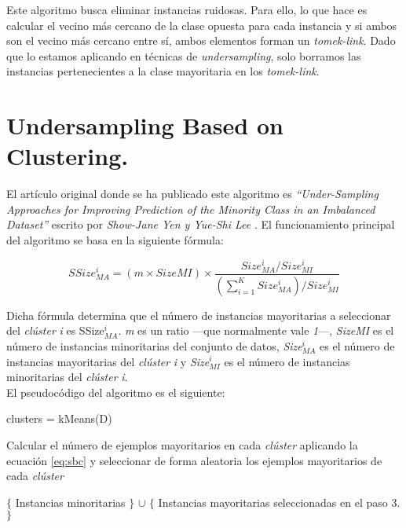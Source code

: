 Este algoritmo busca eliminar instancias ruidosas. Para ello, lo que hace es calcular el vecino más cercano de la clase opuesta para cada instancia y si ambos son el vecino más cercano entre sí, ambos elementos forman un \textit{tomek-link}. Dado que lo estamos aplicando en técnicas de \textit{undersampling}, solo borramos las instancias pertenecientes a la clase mayoritaria en los \textit{tomek-link}.

\section{Undersampling Based on Clustering.} \label{sec:alg_sbc}
El artículo original donde se ha publicado este algoritmo es \textit{``Under-Sampling Approaches for Improving Prediction of the Minority Class in an Imbalanced Dataset''} escrito por \textit{Show-Jane Yen y Yue-Shi Lee} \cite{sbc}. El funcionamiento principal del algoritmo se basa en la siguiente fórmula:

\begin{equation}
\label{eq:sbc}
	SSize_{MA}^{i} = (m \times SizeMI) \times \frac{Size_{MA}^{i} / Size_{MI}^{i}}{\left ( \sum_{i=1}^{K}Size_{MA}^{i} \right ) / Size_{MI}^{i}}
\end{equation}

Dicha fórmula determina que el número de instancias mayoritarias a seleccionar del \textit{clúster} \textit{i} es SSize$_{MA}^{i}$. \textit{m} es un ratio —que normalmente vale \textit{1}—, \textit{SizeMI} es el número de instancias minoritarias del conjunto de datos, \textit{Size$_{MA}^{i}$} es el número de instancias mayoritarias del \textit{clúster} \textit{i} y \textit{Size$_{MI}^{i}$} es el número de instancias minoritarias del \textit{clúster} \textit{i}. \\

El pseudocódigo del algoritmo es el siguiente:

\begin{codigo}
\begin{algorithmic}[1]
\State clusters = kMeans(D)
\State \parbox[t]{305pt}{Calcular el número de ejemplos mayoritarios en cada \textit{clúster} aplicando la ecuación \ref{eq:sbc} y seleccionar de forma aleatoria los ejemplos mayoritarios de cada \textit{clúster} \strut}
\State \parbox[t]{305pt}{\Return $\{$ Instancias minoritarias $\}$ $\cup$ $\{$ Instancias mayoritarias seleccionadas en el paso 3.$\}$\strut}
\EndFunction 
\end{algorithmic}
\end{codigo}

